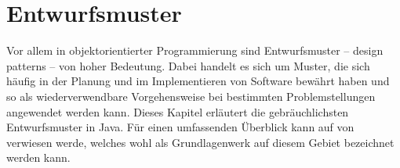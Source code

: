 \section{Entwurfsmuster}\label{designPattern}

Vor allem in objektorientierter Programmierung sind Entwurfsmuster -- \engl design patterns -- von hoher Bedeutung. Dabei handelt es sich um Muster, die sich häufig in der Planung und im Implementieren von Software bewährt haben und so als wiederverwendbare Vorgehensweise bei bestimmten Problemstellungen angewendet werden kann. Dieses Kapitel erläutert die gebräuchlichsten Entwurfsmuster in Java. Für einen umfassenden Überblick kann auf  von \citeauthor{gamma_design_1995} verwiesen werde, welches wohl als Grundlagenwerk auf diesem Gebiet bezeichnet werden kann.




